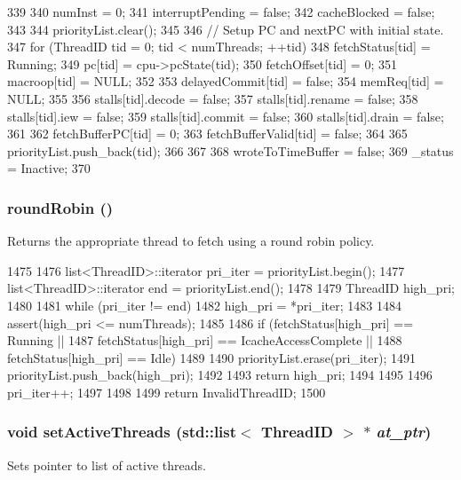 \begin{DoxyCode}
339 {
340     numInst = 0;
341     interruptPending = false;
342     cacheBlocked = false;
343 
344     priorityList.clear();
345 
346     // Setup PC and nextPC with initial state.
347     for (ThreadID tid = 0; tid < numThreads; ++tid) {
348         fetchStatus[tid] = Running;
349         pc[tid] = cpu->pcState(tid);
350         fetchOffset[tid] = 0;
351         macroop[tid] = NULL;
352 
353         delayedCommit[tid] = false;
354         memReq[tid] = NULL;
355 
356         stalls[tid].decode = false;
357         stalls[tid].rename = false;
358         stalls[tid].iew = false;
359         stalls[tid].commit = false;
360         stalls[tid].drain = false;
361 
362         fetchBufferPC[tid] = 0;
363         fetchBufferValid[tid] = false;
364 
365         priorityList.push_back(tid);
366     }
367 
368     wroteToTimeBuffer = false;
369     _status = Inactive;
370 }
\end{DoxyCode}
\hypertarget{classDefaultFetch_a8aab9cacbc483081596b13ecd5192eb5}{
\subsubsection[{roundRobin}]{ roundRobin ()}}
\label{classDefaultFetch_a8aab9cacbc483081596b13ecd5192eb5}
Returns the appropriate thread to fetch using a round robin policy. 


\begin{DoxyCode}
1475 {
1476     list<ThreadID>::iterator pri_iter = priorityList.begin();
1477     list<ThreadID>::iterator end      = priorityList.end();
1478 
1479     ThreadID high_pri;
1480 
1481     while (pri_iter != end) {
1482         high_pri = *pri_iter;
1483 
1484         assert(high_pri <= numThreads);
1485 
1486         if (fetchStatus[high_pri] == Running ||
1487             fetchStatus[high_pri] == IcacheAccessComplete ||
1488             fetchStatus[high_pri] == Idle) {
1489 
1490             priorityList.erase(pri_iter);
1491             priorityList.push_back(high_pri);
1492 
1493             return high_pri;
1494         }
1495 
1496         pri_iter++;
1497     }
1498 
1499     return InvalidThreadID;
1500 }
\end{DoxyCode}
\hypertarget{classDefaultFetch_aab96bdacf8bd420402cbb543f994e054}{
\subsubsection[{setActiveThreads}]{\setlength{\rightskip}{0pt plus 5cm}void setActiveThreads ({\bf std::list}$<$ {\bf ThreadID} $>$ $\ast$ {\em at\_\-ptr})}}
\label{classDefaultFetch_aab96bdacf8bd420402cbb543f994e054}
Sets pointer to list of active threads. 


